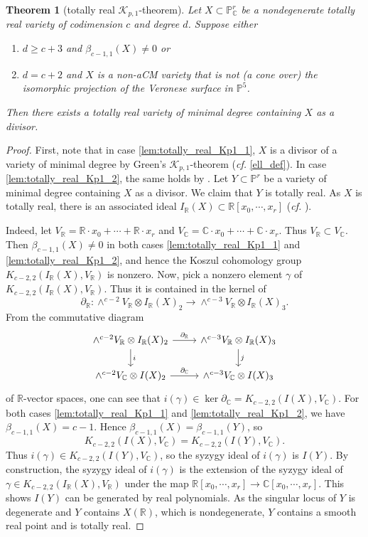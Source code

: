 \documentclass[11pt,letterpaper,reqno]{amsart}
\theoremstyle{plain}
\newtheorem{theorem}{Theorem}[section]
\theoremstyle{definition}
\newtheorem{open problem}[theorem]{Open Problem}
\newtheorem{remark and notation}[theorem]{Remark and Notation}
\newtheorem{remark and definition}[theorem]{Remark and Definition}
\newtheorem{definition and notation}[theorem]{Definition and Notation}
\newtheorem{notation and convention}[theorem]{Notation and Convention}
\newtheorem{notation and remark}[theorem]{Notation and Remark}
\newtheorem{convention and notation}[theorem]{Convention and Notation}
\def \p {\mathbb{P}}
\def \r {\mathbb{R}}
\def \c {\mathbb{C}}
\begin{document}
\begin{theorem}[totally real $\mathcal{K}_{p,1}$-theorem]\label{lem:totally_real_Kp1}
    Let $X\subset\p^r_\c$ be a nondegenerate totally real variety of codimension $c$ and degree $d$. 
    Suppose either
    \begin{enumerate}[\rm (1)]
        \item\label{lem:totally_real_Kp1_1} $d\geq c+3$ and $\beta_{c-1,1}(X)\neq 0$ or
        \item\label{lem:totally_real_Kp1_2} $d=c+2$ and $X$ is a non-aCM variety that is not (a cone over) the isomorphic projection of the Veronese surface in $\p^5$.
    \end{enumerate}
    Then there exists a totally real variety of minimal degree containing $X$ as a divisor.
\end{theorem}
\begin{proof}
    First, note that in case \eqref{lem:totally_real_Kp1_1}, $X$ is a divisor of a variety of minimal degree by Green's $\mathcal{K}_{p,1}$-theorem (\textit{cf.} \eqref{ell_def}).
    In case \eqref{lem:totally_real_Kp1_2}, the same holds by \cite{MR2274517}.
    Let $Y\subset\p^r$ be a variety of minimal degree containing $X$ as a divisor.
    We claim that $Y$ is totally real.
    As $X$ is totally real, there is an associated ideal $I_\r(X)\subset\r[x_0,\cdots,x_r]$ (\textit{cf.} ).

    Indeed, let $V_\r=\r\cdot x_0+\cdots+\r\cdot x_r$ and $V_\c=\c\cdot x_0+\cdots+\c\cdot x_r$.
    Thus $V_\r\subset V_\c$.
    Then $\beta_{c-1,1}(X) \not= 0$ in both cases \eqref{lem:totally_real_Kp1_1} and \eqref{lem:totally_real_Kp1_2}, and hence the Koszul cohomology group $K_{c-2,2}(I_\r(X),V_\r)$ is nonzero. 
    Now, pick a nonzero element $\gamma$ of $K_{c-2,2}(I_\r(X),V_\r)$.
    Thus it is contained in the kernel of
    \[
        \partial_\r:\wedge^{c-2}V_\r\otimes I_\r(X)_2\to \wedge^{c-3}V_\r\otimes I_\r(X)_3.
    \]
    From the commutative diagram
    \[\begin{tikzcd}
        \wedge^{c-2}V_\r\otimes I_\r(X)_2\arrow[r,"\partial_\r"]\arrow[d,"i"] &\wedge^{c-3}V_\r\otimes I_\r(X)_3\arrow[d,"j"]\\
        \wedge^{c-2}V_\c\otimes I(X)_2\arrow[r,"\partial_\c"] &\wedge^{c-3}V_\c\otimes I(X)_3
    \end{tikzcd}\]
    of $\r$-vector spaces, one can see that $i(\gamma)\in \ker \partial_\c=K_{c-2,2}(I(X),V_\c)$.
    For both cases \eqref{lem:totally_real_Kp1_1} and \eqref{lem:totally_real_Kp1_2}, we have $\beta_{c-1,1}(X)=c-1$.
    Hence $\beta_{c-1,1}(X)=\beta_{c-1,1}(Y)$, so $$K_{c-2,2}(I(X),V_\c)=K_{c-2,2}(I(Y),V_\c).$$
    Thus $i(\gamma)\in K_{c-2,2}(I(Y),V_\c)$, so the syzygy ideal of $i(\gamma)$ is $I(Y)$.
    By construction, the syzygy ideal of $i(\gamma)$ is the extension of the syzygy ideal of $\gamma\in K_{c-2,2}(I_\r(X),V_\r)$ under the map $\r[x_0,\cdots,x_r]\to \c[x_0,\cdots,x_r]$.
    This shows $I(Y)$ can be generated by real polynomials.
    As the singular locus of $Y$ is degenerate and $Y$ contains $X(\r)$, which is nondegenerate, $Y$ contains a smooth real point and is totally real.
\end{proof}
\end{document}
